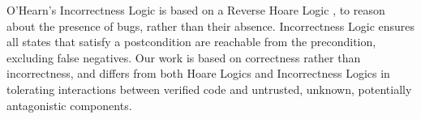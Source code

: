 
O'Hearn's Incorrectness Logic
\cite{IncorrectnessLogic}
is based on a
Reverse Hoare Logic \cite{reverseHoare},
to reason about the presence of bugs, rather than their absence.
Incorrectness Logic ensures all states that satisfy a
postcondition are reachable from the precondition,
excluding false negatives.
%
Our work is based on correctness rather than incorrectness,
and 
differs from both Hoare Logics and Incorrectness Logics
in tolerating interactions between verified code and
untrusted, unknown, potentially antagonistic components.




%







